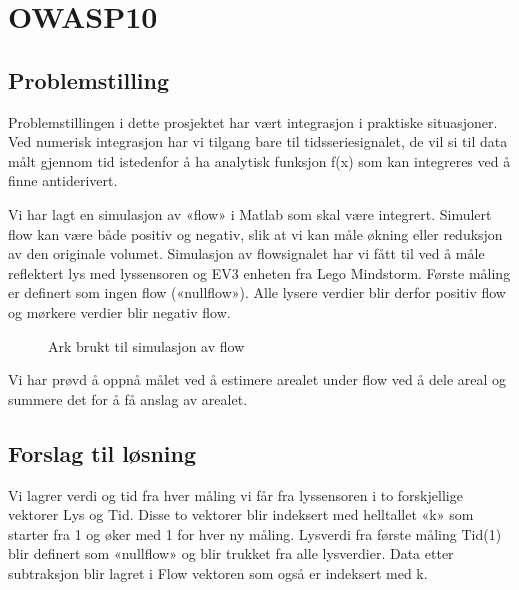 
\chapter{OWASP10 
}\label{kap:integrasjon}


\section{Problemstilling}

Problemstillingen i dette prosjektet har vært integrasjon i praktiske situasjoner. Ved numerisk integrasjon har vi tilgang bare til tidsseriesignalet, de vil si til data målt gjennom tid istedenfor å ha analytisk funksjon f(x) som kan integreres ved å finne antiderivert. 

Vi har lagt en simulasjon av «flow» i Matlab som skal være integrert. Simulert flow kan være både positiv og negativ, slik at vi kan måle økning eller reduksjon av den originale volumet. 
Simulasjon av flowsignalet har vi fått til ved å måle reflektert lys med lyssensoren og EV3 enheten fra Lego Mindstorm. Første måling er definert som ingen flow («nullflow»). Alle lysere verdier blir derfor positiv flow og mørkere verdier blir negativ flow.

\begin{figure}[H]
\centering
\scalebox{0.55}{}%
\caption{Ark brukt til simulasjon av flow}
\label{fig:kap1fig1bane}
\end{figure}

Vi har prøvd å oppnå målet ved å estimere arealet under flow ved å dele areal og summere det for å få anslag av arealet.

\section{Forslag til løsning}

Vi lagrer verdi og tid fra hver måling vi får fra lyssensoren i to forskjellige vektorer Lys og Tid. Disse to vektorer blir indeksert med helltallet «k» som starter fra 1 og øker med 1 for hver ny måling. Lysverdi fra første måling Tid(1) blir definert som «nullflow» og blir trukket fra alle lysverdier. Data etter subtraksjon blir lagret i Flow vektoren som også er indeksert med k.

